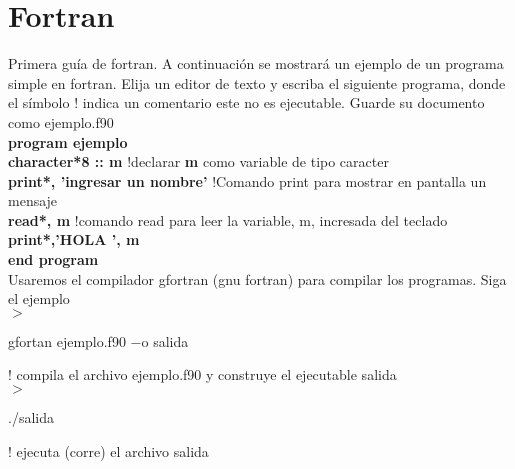 \documentclass[11pt]{exam}
\begin{document}
\firstpageheadrule
\runningheadrule
{}
\cfoot{ }
\begin{flushleft}
\vspace{0.2in}
\vspace{0.25cm}
\end{flushleft}



\section{Fortran}
 

Primera gu\'ia de fortran. 
A continuaci\'on se mostrar\'a un ejemplo de un programa simple en fortran. Elija un editor de texto
y escriba el siguiente programa, donde el s\'imbolo ! indica un comentario este no es ejecutable. Guarde su documento como ejemplo.f90\\

\noindent
\textbf{program ejemplo}\\
  \textbf{character*8 :: m }  \hfill{!declarar \textbf{m} como variable de tipo caracter}\\
  \textbf{print*, 'ingresar un nombre' } \hfill{!Comando print para mostrar en pantalla un mensaje}\\
  \textbf{read*, m } \hfill{!comando read para leer la variable, m, incresada del teclado} \\
  \textbf{print*,'HOLA  ', m}\\		
\textbf{end program}\\


Usaremos el compilador gfortran (gnu fortran)  para compilar los programas. Siga el ejemplo\\
\noindent
$>$  \begin{LARGE}gfortan ejemplo.f90  $-$o salida                                   \end{LARGE}  \hfill{! compila el archivo ejemplo.f90 y construye el ejecutable salida}\\
$>$\begin{LARGE} ./salida                \end{LARGE}  \hfill{! ejecuta (corre) el archivo salida}\\
\end{document}
